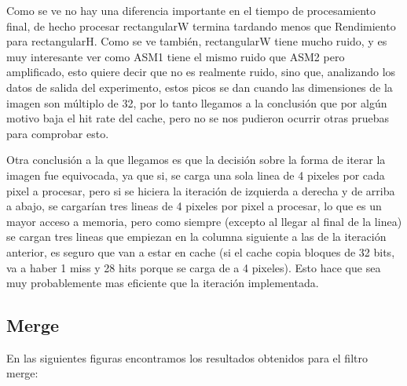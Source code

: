 \documentclass[a4paper]{article}
\begin{document}
Como se ve no hay una diferencia importante en el tiempo de procesamiento final, de hecho procesar rectangularW termina tardando menos que Rendimiento para rectangularH. Como se ve también, rectangularW tiene mucho ruido, y es muy interesante ver como ASM1 tiene el mismo ruido que ASM2 pero amplificado, esto quiere decir que no es realmente ruido, sino que, analizando los datos de salida del experimento, estos picos se dan cuando las dimensiones de la imagen son múltiplo de 32, por lo tanto llegamos a la conclusión que por algún motivo baja el hit rate del cache, pero no se nos pudieron ocurrir otras pruebas para comprobar esto.

Otra conclusión a la que llegamos es que la decisión sobre la forma de iterar la imagen fue equivocada, ya que si, se carga una sola linea de 4 pixeles por cada pixel a procesar, pero si se hiciera la iteración de izquierda a derecha y de arriba a abajo, se cargarían tres lineas de 4 pixeles por pixel a procesar, lo que es un mayor acceso a memoria, pero como siempre (excepto al llegar al final de la linea) se cargan tres lineas que empiezan en la columna siguiente a las de la iteración anterior, es seguro que van a estar en cache (si el cache copia bloques de 32 bits, va a haber 1 miss y 28 hits porque se carga de a 4 pixeles). Esto hace que sea muy probablemente mas eficiente que la iteración implementada.
\newpage

\subsection{Merge}

En las siguientes figuras encontramos los resultados obtenidos para el filtro merge:
\end{document}
